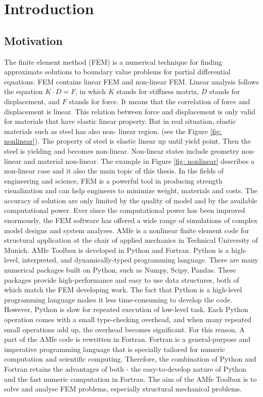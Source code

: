 \chapter{Introduction}



\section{Motivation} \label{sec:Einl:Motivation}
The finite element method (FEM) is a numerical technique for finding approximate solutions to boundary value problems for partial differential equations. FEM contains linear FEM and non-linear FEM. 
Linear analysis follows the equation $K\cdot D = F$, in which $K$ stands for stiffness matrix, $D$ stands for  displacement, and $F$ stands for force. It means that the correlation of force and displacement is linear. This relation between force and displacement is only valid for materials that have elastic linear property. But in real situation, elastic materials such as steel has also non- linear region. (see the Figure \ref{fig: nonlinear}). The property of steel is elastic linear up until yield point. Then the steel is yielding and becomes non-linear. Non-linear states include geometry non-linear and material non-linear. The example in Figure \ref{fig: nonlinear} describes a non-linear case and it also the main topic of this thesis. In the fields of engineering and science, FEM is a powerful tool in producing strength visualization and can help engineers to minimize weight, materials and costs. The accuracy of solution are only limited by the quality of model and by the available computational power.  Ever since the computational power has been improved enormously, the FEM software has offered a wide range of simulations of complex model designs and system analyses.  \newline
AMfe is a nonlinear finite element code for structural application at the chair of applied mechanics in Technical University of Munich. AMfe Toolbox is developed in Python and Fortran. Python is a high-level, interpreted, and dynamically-typed programming language.  There are many numerical packages built on Python, such as Numpy, Scipy, Pandas. These packages provide high-performance and easy to use data structures, both of which match the FEM developing work. The fact that Python is a high-level programming language makes it less time-consuming to develop the code. However, Python is slow for repeated execution of low-level task. Each Python operation comes with a small type-checking overhead, and when many repeated small operations add up, the overhead becomes significant. For this reason, A part of the AMfe code is rewritten in Fortran. Fortran is a general-purpose and imperative programming language that is specially tailored for numeric computation and scientific computing. Therefore, the combination of Python and Fortran retains the advantages of both - the easy-to-develop nature of Python and the fast numeric computation in Fortran. The aim of the AMfe Toolbox is to solve and analyse FEM problems, especially structural mechanical problems.

